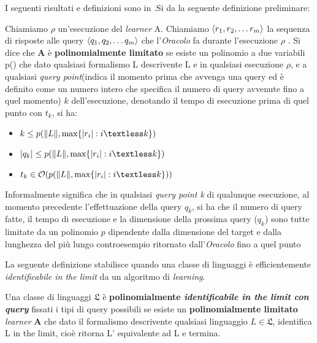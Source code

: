 I seguenti risultati e definizioni sono in \cite{Angluin90}.Si da la seguente definizione preliminare:
\begin{definizione}
Chiamiamo $\rho$ un'esecuzione del \textit{learner} A. Chiamiamo $\Braket{r_1,r_2,\dots r_m}$ la sequenza di risposte alle query $\Braket{q_1,q_2,\dots q_m}$ che l'\textit{Oracolo} fa durante l'esecuzione $\rho$ . Si dice che \textbf{A} è \textbf{polinomialmente  limitato} se esiste un polinomio a due variabili p() che dato qualsiasi formalismo L descrivente  \ac{L} e in qualsiasi esecuzione $\rho$, e a qualsiasi \textit{query point}(indica il momento prima che avvenga una query ed è definito come un numero intero che specifica il numero di query avvenute fino a quel momento) $k$ dell'esecuzione, denotando il tempo di esecuzione prima di quel punto con $t_k$, si ha:
\begin{itemize}
\item $k \le p(\norma{L} , \text{max}\{\abs{r_i} : i \textless k \})$
\item $\abs{q_k} \le p(\norma{L} , \text{max}\{\abs{r_i} : i \textless k \})$
\item $t_k \in \mathcal{O}(p(\norma{L} , \text{max}\{\abs{r_i} : i \textless k \}))$
\end{itemize}
\end{definizione}
Informalmente significa che in qualsiasi \textit{query point k} di qualunque esecuzione, al momento precedente l'effettuazione della query $q_k$, si ha che il numero di query fatte, il tempo di esecuzione e la dimensione della prossima query ($q_k$) sono tutte limitate da un polinomio $p$ dipendente dalla dimensione del target e dalla lunghezza del più lungo controesempio ritornato dall'\textit{Oracolo} fino a quel punto
   
La seguente definizione stabilisce quando una classe di linguaggi è efficientemente \textit{identificabile in the limit} da un algoritmo di  \textit{learning}. 
\begin{definizione}
\label{def:pol}
Una classe di linguaggi $\mathfrak{L}$ è \textbf{polinomialmente \textit{identificabile in the limit con query}} fissati i tipi di query possibili se esiste un \textbf{polinomialmente limitato} \textit{learner} \textbf{A} che dato il formalismo descrivente qualsiasi linguaggio $L \in  \mathfrak{L}$, identifica L in the limit, cioè ritorna  L' equivalente ad L e termina.
\end{definizione}

